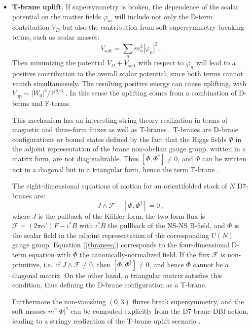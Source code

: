 \documentclass[12pt,a4wide]{article}
\def\V{\mathcal{V}}
\def\be{\begin{equation}}
\def\ee{\end{equation}}
\begin{document}
\begin{itemize}
\item{\bf T-brane uplift}. 
If supersymmetry is broken, the dependence of the scalar potential on the matter fields $\varphi_m$ will include not only the D-term contribution $V_D$ but also the contribution from soft supersymmetry breaking terms, such as scalar masses:
\begin{equation}
    V_{\text{soft}}=\sum_n m_n^2 \left |\varphi_n \right |^2\,.
\end{equation}
Then minimizing the potential
$V_D+ V_{\text{soft}}$ with respect to $\varphi_n$ will lead to a positive contribution to the overall scalar potential, since both terms cannot vanish simultaneously.  The resulting positive energy can cause uplifting, with $V_{\text{up}}\sim |W_0|^2/\V^{8/3}$ \cite{Cicoli:2015ylx}. In this sense the uplifting comes from a combination of D-terms and F-terms.

This mechanism has an interesting string theory realization in terms of magnetic and three-form fluxes as well as T-branes \cite{Cicoli:2015ylx}. T-branes are D-brane configurations or bound states defined  by the fact that the Higgs fields $\Phi$ in the adjoint representation of the brane non-abelian gauge group, written in a matrix form, are not diagonalizable.  Thus $[\Phi,\Phi^\dagger]\neq 0$, and $\Phi$ can be written not in a diagonal but in a triangular form, hence the term T-brane \cite{Donagi:2003hh,Cecotti:2010bp,Donagi:2011jy}. 

The eight-dimensional equations of motion for an orientifolded  stack of $N$ D7-branes are:
\be\label{tbraneeq}
J\wedge \mathcal{F}-\left[\Phi,\Phi^\dagger\right]=0\,,
\ee
where $J$ is the pullback of the K\"ahler form, the two-form flux is  ${\mathcal{F}}=\left(2\pi \alpha' \right) F - \iota^*B$ with $\iota^*B$ the pullback of the NS-NS B-field, and $\Phi$ is the scalar field in the adjoint representation of the corresponding $U(N)$ gauge group. Equation (\ref{tbraneeq}) corresponds to the four-dimensional D-term equation with $\Phi$ the canonically-normalized field. 
If the flux $\mathcal F$ is non-primitive, i.e.~if $J \wedge \mathcal{F} \neq 0$, then $\left[\Phi,\Phi^\dagger\right]\neq 0$, and hence $\Phi$ cannot be a diagonal matrix. On the other hand, a triangular matrix satisfies  
this condition, thus defining the D-brane configuration as a T-brane. 

Furthermore the non-vanishing $(0,3)$ fluxes break supersymmetry, and the soft masses 
$m^2 |\Phi|^2$ can be computed explicitly from the D7-brane DBI action, leading to a stringy realization of the T-brane uplift scenario \cite{Cicoli:2015ylx}. 
 


\end{itemize}
\end{document}

